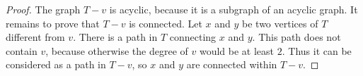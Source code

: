 \begin{proof}
The graph $T - v$ is acyclic, because it is a subgraph of an acyclic graph.
It remains to prove that $T - v$ is connected.
Let $x$ and $y$ be two vertices of $T$ different from $v$.
There is a path in $T$ connecting $x$ and $y$.
This path does not contain $v$, because otherwise the degree of $v$ would be at least $2$.
Thus it can be considered as a path in $T - v$, so $x$ and $y$ are connected within $T - v$.
\end{proof}

